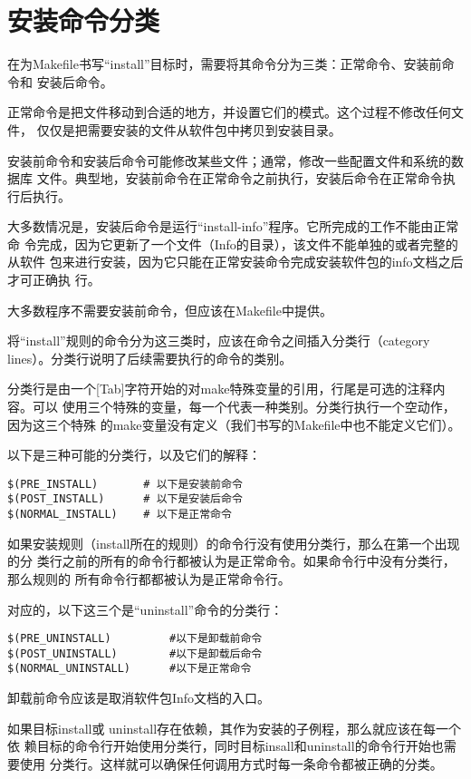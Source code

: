 \section{安装命令分类}
在为Makefile书写“install”目标时，需要将其命令分为三类：正常命令、安装前命令和
安装后命令。

正常命令是把文件移动到合适的地方，并设置它们的模式。这个过程不修改任何文件，
仅仅是把需要安装的文件从软件包中拷贝到安装目录。

安装前命令和安装后命令可能修改某些文件；通常，修改一些配置文件和系统的数据库
文件。典型地，安装前命令在正常命令之前执行，安装后命令在正常命令执行后执行。

大多数情况是，安装后命令是运行“install-info”程序。它所完成的工作不能由正常命
令完成，因为它更新了一个文件（Info的目录），该文件不能单独的或者完整的从软件
包来进行安装，因为它只能在正常安装命令完成安装软件包的info文档之后才可正确执
行。

大多数程序不需要安装前命令，但应该在Makefile中提供。

将“install”规则的命令分为这三类时，应该在命令之间插入分类行（category
lines）。分类行说明了后续需要执行的命令的类别。

分类行是由一个[Tab]字符开始的对make特殊变量的引用，行尾是可选的注释内容。可以
使用三个特殊的变量，每一个代表一种类别。分类行执行一个空动作，因为这三个特殊
的make变量没有定义（我们书写的Makefile中也不能定义它们）。

以下是三种可能的分类行，以及它们的解释：
\begin{Verbatim}[]
$(PRE_INSTALL)       # 以下是安装前命令
$(POST_INSTALL)      # 以下是安装后命令
$(NORMAL_INSTALL)    # 以下是正常命令
\end{Verbatim}

如果安装规则（install所在的规则）的命令行没有使用分类行，那么在第一个出现的分
类行之前的所有的命令行都被认为是正常命令。如果命令行中没有分类行，那么规则的
所有命令行都都被认为是正常命令行。

对应的，以下这三个是“uninstall”命令的分类行：
\begin{Verbatim}[]
$(PRE_UNINSTALL)         #以下是卸载前命令
$(POST_UNINSTALL)        #以下是卸载后命令
$(NORMAL_UNINSTALL)      #以下是正常命令
\end{Verbatim}

卸载前命令应该是取消软件包Info文档的入口。

如果目标install或 uninstall存在依赖，其作为安装的子例程，那么就应该在每一个依
赖目标的命令行开始使用分类行，同时目标insall和uninstall的命令行开始也需要使用
分类行。这样就可以确保任何调用方式时每一条命令都被正确的分类。

